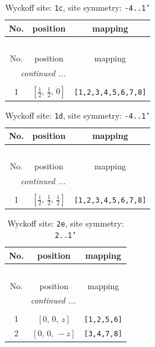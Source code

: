 \documentclass[fleqn,8pt]{jsarticle}
\begin{document}
\begin{longtable}{ccc}
\caption{Wyckoff site: {\tt 1c}, site symmetry: {\tt -4..1'}}
 \\
 \hline \hline
No. & position & mapping \\ \hline \endfirsthead

\multicolumn{2}{l}{\tablename\ \thetable{}} \\
 \hline \hline
No. & position & mapping \\ \hline \endhead

 \hline \hline
\multicolumn{2}{r}{\footnotesize\it continued ...} \\ \endfoot

 \hline \hline
\multicolumn{2}{r}{} \\ \endlastfoot

1 & $\left[ \frac{1}{2},\, \frac{1}{2},\, 0 \right]$ & {\tt [1,2,3,4,5,6,7,8]} \\
\end{longtable}
\renewcommand{\arraystretch}{1.2}
\begin{longtable}{ccc}
\caption{Wyckoff site: {\tt 1d}, site symmetry: {\tt -4..1'}}
 \\
 \hline \hline
No. & position & mapping \\ \hline \endfirsthead

\multicolumn{2}{l}{\tablename\ \thetable{}} \\
 \hline \hline
No. & position & mapping \\ \hline \endhead

 \hline \hline
\multicolumn{2}{r}{\footnotesize\it continued ...} \\ \endfoot

 \hline \hline
\multicolumn{2}{r}{} \\ \endlastfoot

1 & $\left[ \frac{1}{2},\, \frac{1}{2},\, \frac{1}{2} \right]$ & {\tt [1,2,3,4,5,6,7,8]} \\
\end{longtable}
\renewcommand{\arraystretch}{1.2}
\begin{longtable}{ccc}
\caption{Wyckoff site: {\tt 2e}, site symmetry: {\tt 2..1'}}
 \\
 \hline \hline
No. & position & mapping \\ \hline \endfirsthead

\multicolumn{2}{l}{\tablename\ \thetable{}} \\
 \hline \hline
No. & position & mapping \\ \hline \endhead

 \hline \hline
\multicolumn{2}{r}{\footnotesize\it continued ...} \\ \endfoot

 \hline \hline
\multicolumn{2}{r}{} \\ \endlastfoot

1 & $\left[ 0,\, 0,\, z \right]$ & {\tt [1,2,5,6]} \\ \hline
2 & $\left[ 0,\, 0,\, - z \right]$ & {\tt [3,4,7,8]} \\
\end{longtable}
\end{document}
